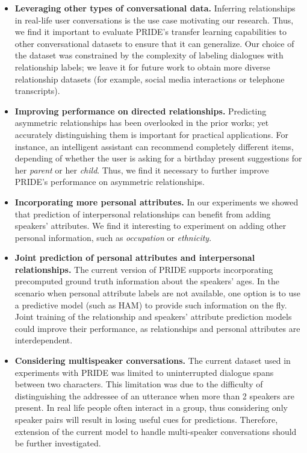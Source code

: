 \begin{itemize}
    \item \textbf{Leveraging other types of conversational data.} Inferring relationships in real-life user conversations is the use case motivating our research. Thus, we find it important to evaluate PRIDE's transfer learning capabilities to other conversational datasets to ensure that it can generalize. Our choice of the dataset was constrained by the complexity of labeling dialogues with relationship labels; we leave it for future work to obtain more diverse relationship datasets (for example, social media interactions or telephone transcripts).
    
    \item \textbf{Improving performance on directed relationships.} Predicting asymmetric relationships has been overlooked in the prior works; yet accurately distinguishing them is important for practical applications. For instance, an intelligent assistant can recommend completely different items, depending of whether the user is asking for a birthday present suggestions for her \textit{parent} or her \textit{child}. Thus, we find it necessary to further improve PRIDE's performance on asymmetric relationships.
    
    \item \textbf{Incorporating more personal attributes.} In our experiments we showed that prediction of interpersonal relationships can benefit from adding speakers' attributes. We find it interesting to experiment on adding other personal information, such as \textit{occupation} or \textit{ethnicity}.

    \item \textbf{Joint prediction of personal attributes and interpersonal relationships.} The current version of PRIDE supports incorporating precomputed ground truth information about the speakers' ages. In the scenario when personal attribute labels are not available, one option is to use a predictive model (such as HAM) to provide such information on the fly. Joint training of the relationship and speakers' attribute prediction models could improve their performance, as relationships and personal attributes are interdependent.

    \item \textbf{Considering multispeaker conversations.} The current dataset used in experiments with PRIDE was limited to uninterrupted dialogue spans between two characters. This limitation was due to the difficulty of distinguishing the addressee of an utterance when more than 2 speakers are present. In real life people often interact in a group, thus considering only speaker pairs will result in losing useful cues for predictions. Therefore, extension of the current model to handle multi-speaker conversations should be further investigated.

    
\end{itemize}

